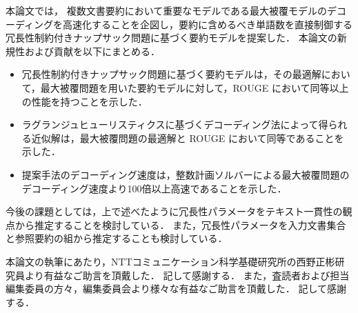 \documentclass[japanese]{jnlp_1.4}
\begin{document}
本論文では，
複数文書要約において重要なモデルである最大被覆モデルのデコーディングを高速化することを企図し，要約に含めるべき単語数を直接制御する冗長性制約付きナップサック問題に基づく要約モデルを提案した．
本論文の新規性および貢献を以下にまとめる．

\begin{itemize}
\item 冗長性制約付きナップサック問題に基づく要約モデルは，その最適解において，最大被覆問題を用いた要約モデルに対して，ROUGE \cite{lin04} において同等以上の性能を持つことを示した．
\item ラグランジュヒューリスティクスに基づくデコーディング法によって得られる近似解は，最大被覆問題の最適解と ROUGE において同等であることを示した．
\item 提案手法のデコーディング速度は，整数計画ソルバーによる最大被覆問題のデコーディング速度より100倍以上高速であることを示した．
\end{itemize}

今後の課題としては，上で述べたように冗長性パラメータをテキスト一貫性の観点から推定することを検討している．
また，冗長性パラメータを入力文書集合と参照要約の組から推定することも検討している．


\acknowledgment

本論文の執筆にあたり，NTTコミュニケーション科学基礎研究所の西野正彬研究員より有益なご助言を頂戴した．
記して感謝する．
また，査読者および担当編集委員の方々，編集委員会より様々な有益なご助言を頂戴した．
記して感謝する．
\end{document}

